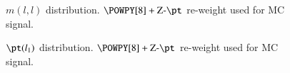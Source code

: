 \begin{figure}[h!tbp]
	\centering
	\hfill
	\caption{$m(l,l)$ distribution. $\POWPY[8]+\text{Z-}\pt$ re-weight used for MC signal.}
	\label{AFig10P}
\end{figure} 

\begin{figure}[h!tbp]
	\centering
	\hfill
	\caption{$\pt(l_1)$ distribution. $\POWPY[8]+\text{Z-}\pt$ re-weight used for MC signal.}
	\label{AFig11P}
\end{figure} 

